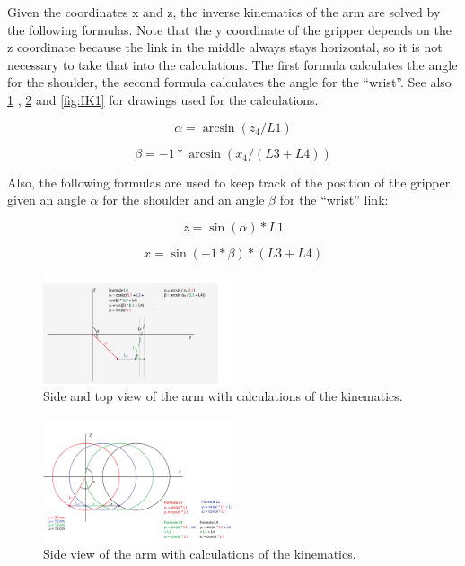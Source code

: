 \documentclass[project_eva.tex]{subfiles}
\begin{document}
Given the coordinates x and z, the inverse kinematics of the arm are solved by the following formulas. Note that the y 
coordinate of the gripper depends on the z coordinate because the link in the middle always stays horizontal, so it is 
not necessary to take that into the calculations. The first formula calculates the angle for the shoulder, the second 
formula calculates the angle for the ``wrist''. See also \ref{fig:IK0} , \ref{fig:IK2} and \ref{fig:IK1} for drawings 
used for the calculations.

\begin{equation*}
\alpha = \arcsin(z_4/L1)
\end{equation*}

\begin{equation*}
\beta = -1 * \arcsin(x_4/(L3 + L4))
\end{equation*}

Also, the following formulas are used to keep track of the position of the gripper, given an angle $\alpha$ for the 
shoulder and an angle $\beta$ for the ``wrist'' link:

\begin{equation*}
z = \sin(\alpha)*L1
\end{equation*}

\begin{equation*}
x = \sin(-1 * \beta)*(L3 + L4)
\end{equation*}

\begin{figure}[h]
	\centering
	\mbox{\includegraphics[width=0.5\textwidth]{Images/3d_zijenbovenaanzicht.png}}
	\caption{Side and top view of the arm with calculations of the kinematics.}
	\label{fig:IK0}
\end{figure}

\begin{figure}[h]
	\centering
	\mbox{\includegraphics[width=0.5\textwidth]{Images/2d_zijaanzicht.png}}
	\caption{Side view of the arm with calculations of the kinematics.}
	\label{fig:IK2}
\end{figure}
\end{document}
